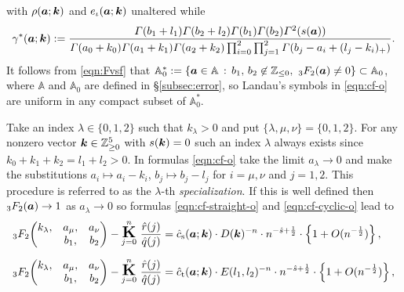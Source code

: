 \documentclass[a4paper,12pt]{article}
\theoremstyle{plain}
\def\rs{\mathrm{s}}
\def\rt{\mathrm{t}}
\def\A{\mathbb{A}}
\def\Z{\mathbb{Z}}
\def\vG{\varGamma}
\def\ba{\mbox{\boldmath $a$}}
\def\bk{\mbox{\boldmath $k$}}
\def\cfL{\mbox{\Large \boldmath $\mathrm{K}$}}
\begin{document}
with $\rho(\ba; \bk)$ and $e_{\iota}(\ba; \bk)$ unaltered while  
\[
\gamma^*(\ba; \bk) := \frac{\vG(b_1+l_1) \vG(b_2+l_2) \vG(b_1) \vG(b_2) 
\vG^2(s(\ba)) }{\vG(a_0+k_0) \vG(a_1+k_1) \vG(a_2+k_2) 
\prod_{i=0}^2 \prod_{j=1}^2 \vG(b_j-a_i+(l_j-k_i)_+)}. 
\]
It follows from \eqref{eqn:Fvsf} that $\A_0^* 
:= \{ \ba \in \A \,:\, b_1, \, b_2 \not \in \Z_{\le 0}, \,\, 
{}_3 F_2 (\ba) \neq 0 \} \subset \A_0$, where $\A$ and $\A_0$ are 
defined in \S \ref{subsec:error}, so Landau's symbols in \eqref{eqn:cf-o} 
are uniform in any compact subset of $\A_0^*$.  
\par
Take an index $\lambda \in \{0, 1, 2\}$ such that $k_{\lambda} > 0$ 
and put $\{\lambda, \mu, \nu\} = \{0, 1, 2\}$.  
For any nonzero vector $\bk \in \Z_{\ge0}^5$ with $s(\bk) =0$ such an 
index $\lambda$ always exists since $k_0+k_1+k_2 = l_1+l_2 > 0$. 
In formulas \eqref{eqn:cf-o} take the limit $a_{\lambda} \to 0$ and 
make the substitutions $a_i \mapsto a_i-k_i$, $b_j \mapsto b_j-l_j$ 
for $i = \mu, \nu$ and $j = 1, 2$.  
This procedure is referred to as the $\lambda$-th {\sl specialization}. 
If this is well defined then ${}_3F_2(\ba) \to 1$ as 
$a_{\lambda} \to 0$ so formulas \eqref{eqn:cf-straight-o} and 
\eqref{eqn:cf-cyclic-o} lead to     
\begin{subequations} \label{eqn:cf-s}
\begin{align} 
{}_3F_2\! 
\begin{pmatrix} 
k_{\lambda}, & a_{\mu}, & a_{\nu} \\ 
     & b_1, & b_2    
\end{pmatrix}
- \overset{n}{\underset{j=0}{\cfL}} \,\, \frac{ \hat{r}(j) }{ \hat{q}(j) } 
&= \hat{c}_{\rs}(\ba; \bk)    
\cdot D(\bk)^{-n} \cdot n^{- \hat{s} + \frac{1}{2} } \cdot 
\left\{ 1 + O (n^{-\frac{1}{2} } ) \right\},  \label{eqn:cf-straight-s} \\[2mm] 
{}_3F_2\! 
\begin{pmatrix} 
k_{\lambda}, & a_{\mu}, & a_{\nu} \\ 
     & b_1, & b_2    
\end{pmatrix} 
 - \overset{n}{\underset{j=0}{\cfL}} \,\, \frac{ \hat{r}(j)}{ \hat{q}(j) } 
&= \hat{c}_{\rt}(\ba; \bk) \cdot E(l_1, l_2)^{-n} \cdot n^{- \hat{s} + \frac{1}{2} } 
\cdot \left\{ 1 + O (n^{-\frac{1}{2} } ) \right\},  \label{eqn:cf-cyclic-s}
\end{align}
\end{subequations} 
\end{document}
